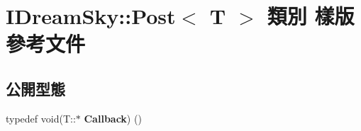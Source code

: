 \hypertarget{class_i_dream_sky_1_1_post}{}\section{I\+Dream\+Sky\+:\+:Post$<$ T $>$ 類別 樣版 參考文件}
\label{class_i_dream_sky_1_1_post}
\subsection*{公開型態}
\begin{DoxyCompactItemize}
\item 
typedef void(T\+::$\ast$ {\bfseries Callback}) ()\hypertarget{class_i_dream_sky_1_1_post_a72409940e47f12393fca1e477c320253}{}\label{class_i_dream_sky_1_1_post_a72409940e47f12393fca1e477c320253}

\end{DoxyCompactItemize}
